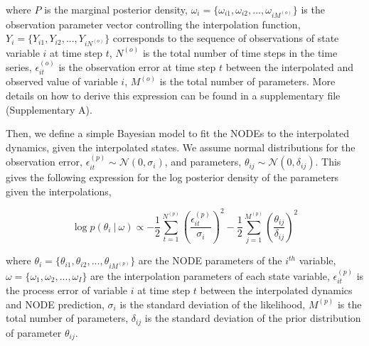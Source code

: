 \documentclass[11pt, oneside]{article}
\begin{document}
where $P$ is the marginal posterior density,
$\omega_i = \{\omega_{i1},\omega_{i2},...,\omega_{iM^{(o)}}\}$ is the observation parameter vector controlling the interpolation function,
$Y_i = \{Y_{i1},Y_{i2},...,Y_{iN^{(o)}}\}$ corresponds to the sequence of observations of state variable $i$ at time step $t$, 
$N^{(o)}$ is the total number of time steps in the time series, 
$\epsilon^{(o)}_{it}$ is the observation error at time step $t$ between the interpolated and observed  value of variable $i$, 
$M^{(o)}$ is the total number of parameters. 
More details on how to derive this expression can be found in a supplementary file (Supplementary A).

Then, we define a simple Bayesian model to fit the NODEs to the interpolated dynamics, given the interpolated states.
We assume normal distributions for the observation error, $\epsilon^{(p)}_{it} \sim \mathcal{N}(0,\sigma_i)$, and parameters, $\theta_{ij} \sim \mathcal{N}(0,\delta_{ij})$.
This gives the following expression for the log posterior density of the parameters given the interpolations,

\vspace{-0.5cm}
\begin{equation}
    \log p(\theta_i ~|~ \omega) \propto - \frac{1}{2} \sum_{t=1}^{N^{(p)}} \left( \frac{\epsilon^{(p)}_{it}}{\sigma_i} \right)^2 - \frac{1}{2} \sum_{j=1}^{M^{(p)}} \left( \frac{\theta_{ij}}{\delta_{ij}} \right)^2
\end{equation}

where $\theta_i = \{\theta_{i1},\theta_{i2},...,\theta_{iM^{(p)}}\}$ are the NODE parameters of the $i^{th}$ variable,
$\omega = \{\omega_1,\omega_2,...,\omega_I\}$ are the interpolation parameters of each state variable, 
$\epsilon^{(p)}_{it}$ is the process error of variable $i$ at time step $t$ between the interpolated dynamics and NODE prediction, 
$\sigma_i$ is the standard deviation of the likelihood, 
$M^{(p)}$ is the total number of parameters, 
$\delta_{ij}$ is the standard deviation of the prior distribution of parameter $\theta_{ij}$.
\end{document}
